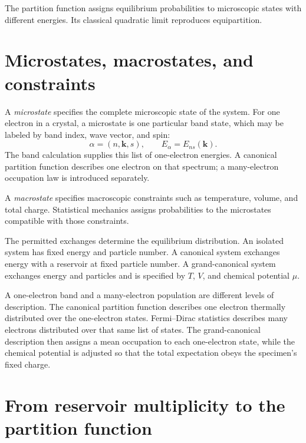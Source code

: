 The partition function assigns equilibrium probabilities to microscopic states
with different energies.  Its classical quadratic limit reproduces
equipartition.

\section{Microstates, macrostates, and constraints}

A \emph{microstate} specifies the complete microscopic state of the system.
For one electron in a crystal, a microstate is one particular band state,
which may be labeled by band index, wave vector, and spin:
\begin{equation}
  \alpha=(n,\bm k,s),
  \qquad E_\alpha=E_{ns}(\bm k).
  \label{eq:single-electron-band-state-label}
\end{equation}
The band calculation supplies this list of one-electron energies.  A canonical
partition function describes one electron on that spectrum; a many-electron
occupation law is introduced separately.

A \emph{macrostate} specifies macroscopic constraints such as temperature,
volume, and total charge.  Statistical mechanics assigns probabilities to the
microstates compatible with those constraints.

The permitted exchanges determine the equilibrium distribution.  An isolated
system has fixed energy and particle number.  A canonical system exchanges
energy with a reservoir at fixed particle number.  A grand-canonical system
exchanges energy and particles and is specified by $T$, $V$, and chemical
potential $\mu$.

A one-electron band and a many-electron population are different levels of
description.  The canonical partition function describes one electron
thermally distributed over the one-electron states.  Fermi--Dirac statistics
describes many electrons distributed over that same list of states.
The grand-canonical description then assigns a mean occupation to each
one-electron state, while the chemical potential is adjusted so that the total
expectation obeys the specimen's fixed charge.

\section{From reservoir multiplicity to the partition function}

